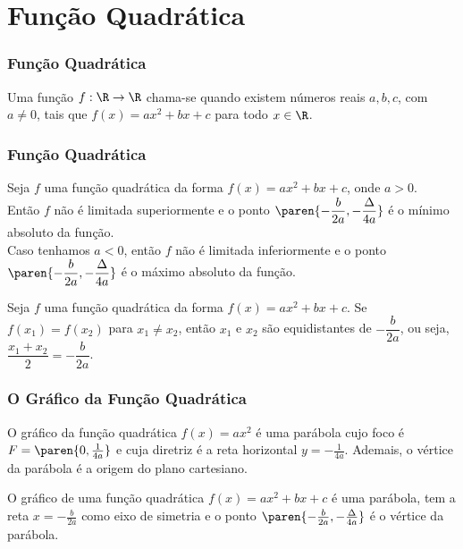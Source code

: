 \section{Função Quadrática}
\begin{frame}
\frametitle{Função Quadrática} 

\begin{definicao}
Uma função $f: \R \to \R$ chama-se  quando existem
números reais $a, b, c$, com $a \neq 0$, tais que $f(x) = ax^2 +bx
+c$ para todo $x \in \R$.
\end{definicao}


\end{frame}


\begin{frame}
\frametitle{Função Quadrática} 

\begin{proposicao}
Seja $f$ uma função quadrática da forma $f(x) = ax^2 + bx +c$, onde
$a >0$.\\
Então $f$ não é limitada superiormente e o ponto
$\paren{-\dfrac {b} {2a}, -\dfrac {\Delta} {4a}}$ é o mínimo absoluto
da função.\\
Caso tenhamos $a<0$, então $f$ não é limitada inferiormente e  o
ponto $\paren{-\dfrac {b} {2a}, -\dfrac {\Delta} {4a}}$ é o máximo
absoluto da função.
\end{proposicao}\pause

\begin{proposicao}
Seja $f$ uma função quadrática da forma $f(x) = ax^2 + bx +c$. Se
$f(x_1) = f(x_2)$ para $x_1 \neq x_2$, então $x_1$ e $x_2$ são
equidistantes de $-\dfrac{b} {2a}$, ou seja, $\dfrac{x_1 +x_2} 2 =
-\dfrac{b}{2a}$.
\end{proposicao}

\end{frame}


\begin{frame}
\frametitle{O Gráfico da Função Quadrática} 

\begin{exemplo}
O gráfico da função quadrática $f(x) = ax^2$ é uma parábola cujo
foco é $F = \paren{0, \frac 1 {4a}}$ e cuja diretriz é a reta
horizontal $y = -\frac{1}{4a}$. Ademais, o vértice da parábola é a
origem do plano cartesiano.
\end{exemplo}\pause

\begin{proposicao}
O gráfico de uma função quadrática $f(x) = ax^2 + bx + c$ é uma
parábola, tem a reta $x = -\frac {b}{2a}$ como eixo de simetria e o
ponto $\paren{-\frac {b} {2a}, -\frac {\Delta} {4a}}$ é o vértice da
parábola.
\end{proposicao}

\end{frame}

